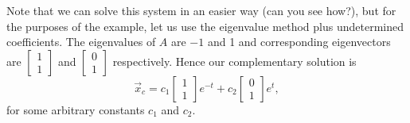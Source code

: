 \documentclass{ximera}
\begin{document}
\begin{exampleSol}
    Note that we can solve this system in an easier way (can you see how?), but for the purposes of the example, let us use the eigenvalue method plus undetermined coefficients. The eigenvalues of $A$ are $-1$ and 1 and corresponding eigenvectors
    are
    $\left[\begin{smallmatrix}
        1 \\
        1
    \end{smallmatrix} \right]$ 
    and
    $\left[ \begin{smallmatrix}
        0 \\
        1
    \end{smallmatrix} \right]$ 
    respectively. Hence our complementary solution is
    \begin{equation*}
        \vec{x}_c =  c_1
        \begin{bmatrix}
            1 \\ 
            1
        \end{bmatrix}
        e^{-t} + c_2
        \begin{bmatrix}
            0 \\ 
            1
        \end{bmatrix}
        e^{t} ,
    \end{equation*}
    for some arbitrary constants $c_1$ and $c_2$.
    

\end{exampleSol}
\end{document}
